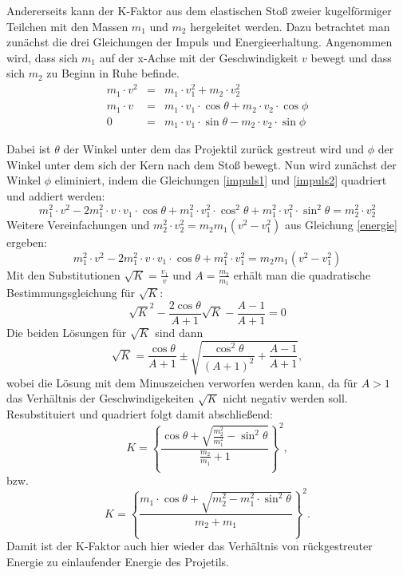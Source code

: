 Andererseits kann der K-Faktor aus dem elastischen Stoß zweier kugelförmiger Teilchen mit den Massen $m_1$ und $m_2$ hergeleitet werden. Dazu betrachtet man zunächst die drei Gleichungen der Impuls und Energieerhaltung. Angenommen wird, dass sich $m_1$ auf der x-Achse mit der Geschwindigkeit $v$ bewegt und dass sich $m_2$  zu Beginn in Ruhe befinde.
\begin{eqnarray}
 m_1\cdot v^2 & = & m_1\cdot v_1^2 + m_2\cdot v_2^2\label{energie}\\
 m_1\cdot v & = & m_1\cdot v_1\cdot \cos \theta + m_2\cdot v_2\cdot \cos \phi\label{impuls1}\\
 0 &=& m_1\cdot v_1\cdot \sin \theta - m_2\cdot v_2\cdot\sin \phi\label{impuls2}
\end{eqnarray}

Dabei ist $\theta$ der Winkel unter dem das Projektil zurück gestreut wird und $\phi$ der Winkel unter dem sich der Kern nach dem Stoß bewegt. Nun wird zunächst der Winkel $\phi$ eliminiert, indem die Gleichungen \ref{impuls1} und \ref{impuls2} quadriert und addiert werden:
\begin{equation}
 m_1^2\cdot v^2- 2m_1^2\cdot v\cdot v_1\cdot \cos \theta + m_1^2\cdot v_1^2\cdot\cos^2\theta + m_1^2\cdot v_1^2\cdot \sin^2\theta = m_2^2\cdot v_2^2
\end{equation}
Weitere Vereinfachungen und $m_2^2\cdot v_2^2=m_2m_1(v^2-v_1^2)$ aus Gleichung \ref{energie}  ergeben:
\begin{equation}
 m_1^2\cdot v^2- 2m_1^2\cdot v\cdot v_1\cdot \cos \theta + m_1^2\cdot v_1^2= m_2m_1(v^2-v_1^2)
\end{equation}
Mit den Substitutionen $\sqrt{K}=\frac{v_1}{v}$ und $A=\frac{m_2}{m_1}$ erhält man die quadratische Bestimmungsgleichung für $\sqrt{K}$:
\begin{equation}
 \sqrt{K}^2 - \frac{2\cos\theta}{A+1}\sqrt{K} - \frac{A-1}{A+1}=0
\end{equation}
Die beiden Lösungen für $\sqrt{K}$ sind dann
\begin{equation}
  \sqrt{K}=\frac{\cos\theta}{A+1}\pm\sqrt{\frac{\cos^2 \theta}{(A+1)^2}+\frac{A-1}{A+1}}, 
\end{equation}
wobei die Lösung mit dem Minuszeichen verworfen werden kann, da für $A>1$ das Verhältnis der Geschwindigekeiten $\sqrt{K}$ nicht negativ werden soll. Resubstituiert und quadriert folgt damit abschließend:
\begin{equation}
 K = \left\{ \frac{\cos \theta+ \sqrt{\frac{m_2^2}{m_1^2}-\sin^2\theta}}{\frac{m_2}{m_1}+1} \right\}^2,
\end{equation}
bzw.
\begin{equation}
 K = \left\{ \frac{m_1\cdot\cos \theta+ \sqrt{m_2^2-m_1^2\cdot\sin^2\theta}}{m_2+m_1} \right\}^2.
\end{equation}
Damit ist der K-Faktor auch hier wieder das Verhältnis von rückgestreuter Energie zu einlaufender Energie des Projetils.

